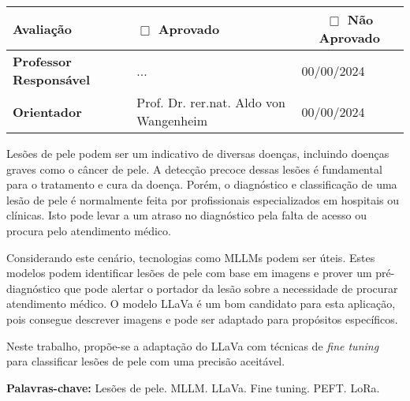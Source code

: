 \begin{folhadeaprovacao}
	\vspace{-4pt}

	\tiny
	\noindent \begin{tabularx}{\textwidth}{| l | X | l | l |}
		\hline
		{\textbf{Avaliação}}             & \multicolumn{1}{l}{\textbf{$\Box$ Aprovado}} & \multicolumn{2}{c|}{\textbf{$\Box$ Não Aprovado}}   \\ \hline
		{\textbf{Professor Responsável}} & {...}                                        & {00/00/2024}                                      & \\ \hline
		{\textbf{Orientador}}            & {Prof. Dr. rer.nat. Aldo von Wangenheim}     & {00/00/2024}                                      & \\ \hline
	\end{tabularx}
\end{folhadeaprovacao}

\setlength{\absparsep}{18pt}
\begin{resumo}
	\SingleSpacing

	Lesões de pele podem ser um indicativo de diversas doenças, incluindo doenças graves como o câncer de pele. A detecção precoce dessas lesões é fundamental para o
	tratamento e cura da doença. Porém, o diagnóstico e classificação de uma lesão de pele é normalmente feita por profissionais especializados em hospitais ou clínicas.
	Isto pode levar a um atraso no diagnóstico pela falta de acesso ou procura pelo atendimento médico.

	Considerando este cenário, tecnologias como \ac{MLLMs} podem ser úteis. Estes modelos podem identificar lesões de pele com base em imagens e prover um pré-diagnóstico
	que pode alertar o portador da lesão sobre a necessidade de procurar atendimento médico. O modelo \ac{LLaVa} é um bom candidato para esta aplicação, pois consegue
	descrever imagens e pode ser adaptado para propósitos específicos.

	Neste trabalho, propõe-se a adaptação do \ac{LLaVa} com técnicas de \textit{fine tuning} para classificar lesões de pele com uma precisão aceitável.

	\textbf{Palavras-chave:} Lesões de pele. MLLM. LLaVa. Fine tuning. PEFT. LoRa.
\end{resumo}



{
\hypersetup{hidelinks}

\imprimirlistadesiglas

\tableofcontents*
\cleardoublepage
}
